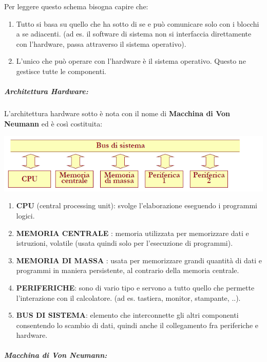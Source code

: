 \documentclass[
  paper=a4,
  oneside  ,captions=tableheading
]{scrbook}
\providecommand{\tightlist}{%
  \setlength{\itemsep}{0pt}\setlength{\parskip}{0pt}}
\begin{document}
Per leggere questo schema bisogna capire che:

\begin{enumerate}
\def\labelenumi{\arabic{enumi}.}
\tightlist
\item
  Tutto si basa su quello che ha sotto di se e può comunicare solo con i
  blocchi a se adiacenti. (ad es. il software di sistema non si
  interfaccia direttamente con l'hardware, passa attraverso il sistema
  operativo).
\item
  L'unico che può operare con l'hardware è il sistema operativo. Questo
  ne gestisce tutte le componenti.
\end{enumerate}

\hypertarget{architettura-hardware}{%
\subparagraph{Architettura Hardware:}\label{architettura-hardware}}

L'architettura hardware sotto è nota con il nome di \textbf{Macchina di
Von Neumann} ed è così costituita:

\includegraphics{./image/image-20201111172642835.png}

\begin{enumerate}
\def\labelenumi{\arabic{enumi}.}
\tightlist
\item
  \textbf{CPU} (central processing unit): svolge l'elaborazione
  eseguendo i programmi logici.
\item
  \textbf{MEMORIA CENTRALE }: memoria utilizzata per memorizzare dati e
  istruzioni, volatile (usata quindi solo per l'esecuzione di
  programmi).
\item
  \textbf{MEMORIA DI MASSA }: usata per memorizzare grandi quantità di
  dati e programmi in maniera persistente, al contrario della memoria
  centrale.
\item
  \textbf{PERIFERICHE}: sono di vario tipo e servono a tutto quello che
  permette l'interazione con il calcolatore. (ad es. tastiera, monitor,
  stampante, ..).
\item
  \textbf{BUS DI SISTEMA}: elemento che interconnette gli altri
  componenti consentendo lo scambio di dati, quindi anche il
  collegamento fra periferiche e hardware.
\end{enumerate}

\hypertarget{macchina-di-von-neumann}{%
\subparagraph{Macchina di Von Neumann:}\label{macchina-di-von-neumann}}
\end{document}
